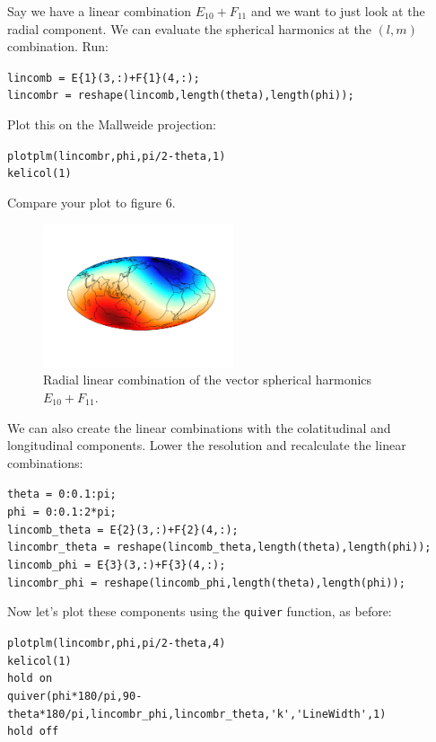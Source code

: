 \documentclass[11pt]{article}
\begin{document}
Say we have a linear combination $E_{10}+F_{11}$ and we want to just look at the radial component.  We can evaluate the spherical harmonics at the $(l,m)$ combination.  Run:

\verb|lincomb = E{1}(3,:)+F{1}(4,:);|\\
\verb|lincombr = reshape(lincomb,length(theta),length(phi));|

Plot this on the Mallweide projection:

\verb|plotplm(lincombr,phi,pi/2-theta,1)|\\
\verb|kelicol(1)|

Compare your plot to figure 6.
\begin{figure}[H]
  \centering
  \includegraphics[width=0.5\textwidth]{figures_Rep2/lincombEF1.png}  
  \caption{Radial linear combination of the vector spherical harmonics $E_{10}+F_{11}$.}
\label{EFcomb}
\end{figure}

We can also create the linear combinations with the colatitudinal and longitudinal components.  Lower the resolution and recalculate the linear combinations:

\verb|theta = 0:0.1:pi;|\\
\verb|phi = 0:0.1:2*pi;|\\
\verb|lincomb_theta = E{2}(3,:)+F{2}(4,:);|\\
\verb|lincombr_theta = reshape(lincomb_theta,length(theta),length(phi));|\\
\verb|lincomb_phi = E{3}(3,:)+F{3}(4,:);|\\
\verb|lincombr_phi = reshape(lincomb_phi,length(theta),length(phi));|

Now let's plot these components using the \verb|quiver| function, as before:

\verb|plotplm(lincombr,phi,pi/2-theta,4)|\\
\verb|kelicol(1)|\\
\verb|hold on|\\
\verb|quiver(phi*180/pi,90-theta*180/pi,lincombr_phi,lincombr_theta,'k','LineWidth',1)|\\
\verb|hold off|
\end{document}
